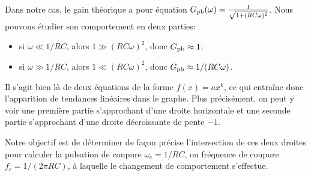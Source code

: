 Dans notre cas, le gain théorique a pour équation
$G_{\mathrm{pb}}(\omega) = \frac{1}{\sqrt{1+(RC\omega)^2}}$.
Nous pouvons étudier son comportement en deux parties:
\begin{itemize}
    \item si $\omega \ll 1/RC$, alors $1 \gg (RC\omega)^2$,
        donc $G_{\mathrm{pb}} \approx 1$;
    \item si $\omega \gg 1/RC$, alors $1 \ll (RC\omega)^2$,
        donc $G_{\mathrm{pb}} \approx 1/(RC\omega)$.
\end{itemize}

Il s'agit bien là de deux équations de la forme $f(x) = ax^k$,
ce qui entraîne donc l'apparition de tendances linéaires dans le graphe.
Plus précisément, on peut y voir
une première partie s'approchant d'une droite horizontale et
une seconde partie s'approchant d'une droite décroissante
de pente $-1$.

Notre objectif est de déterminer de façon précise
l'intersection de ces deux droites
pour calculer la pulsation de coupure $\omega_c=1/RC$,
ou fréquence de coupure $f_c=1/(2\pi RC)$,
à laquelle le changement de comportement s'effectue.
